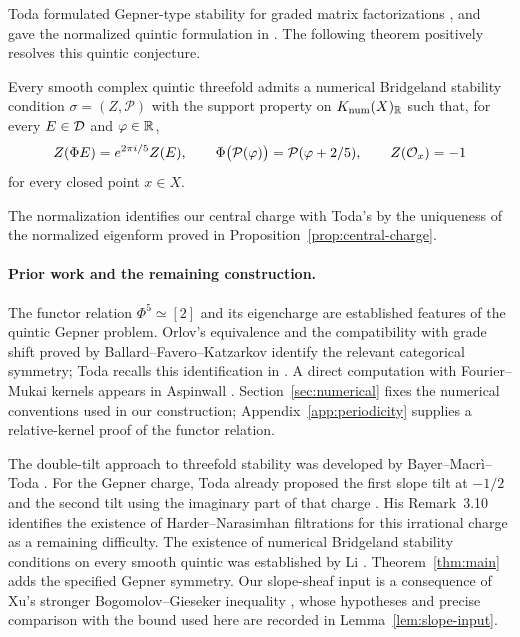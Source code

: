 Toda formulated Gepner-type stability for graded matrix factorizations
\cite[Definition~2.3 and Conjecture~1.2]{Toda2013}, and gave the normalized
quintic formulation in \cite[Conjecture~3.1]{TodaQuintic2013}.
The following theorem positively resolves this quintic conjecture.

\begin{theorem}\label{thm:main}
Every smooth complex quintic threefold admits a numerical Bridgeland stability
condition $\sigma=(Z,\mathcal P)$ with the support property on $K_{\mathrm{num}}(X)_{\mathbb R}$
such that, for every $E\in\mathcal D$ and $\varphi\in\mathbb R$,
\[
 Z(\Phi E)=e^{2\pi i/5}Z(E),\qquad
 \Phi\bigl(\mathcal P(\varphi)\bigr)=\mathcal P(\varphi+2/5),\qquad
 Z(\mathcal O_x)=-1
\]
for every closed point $x\in X$.
\end{theorem}

The normalization identifies our central charge with Toda's by the uniqueness
of the normalized eigenform proved in Proposition~\ref{prop:central-charge}.

\paragraph{Prior work and the remaining construction.}
The functor relation $\Phi^5\simeq[2]$ and its eigencharge are established
features of the quintic Gepner problem. Orlov's equivalence
\cite[Theorem~2.5]{Orlov2009} and the compatibility with grade shift proved by
Ballard--Favero--Katzarkov \cite[Proposition~5.8 and Remark~5.12]{BallardFaveroKatzarkov2012}
identify the relevant categorical symmetry; Toda recalls this identification
in \cite[Theorem~2.5]{TodaQuintic2013}. A direct computation with
Fourier--Mukai kernels appears in Aspinwall \cite[Section~7.1.4]{Aspinwall2004}.
Section~\ref{sec:numerical} fixes the numerical conventions used in our
construction; Appendix~\ref{app:periodicity} supplies a relative-kernel proof
of the functor relation.

The double-tilt approach to threefold stability was developed by
Bayer--Macr\`i--Toda \cite{BayerMacriToda2014}. For the Gepner charge, Toda
already proposed the first slope tilt at $-1/2$ and the second tilt using
the imaginary part of that charge
\cite[Sections~3.4--3.6 and Conjecture~3.9]{TodaQuintic2013}.
His Remark~3.10 identifies the existence of Harder--Narasimhan filtrations
for this irrational charge as a remaining difficulty.
The existence of numerical Bridgeland stability conditions on every smooth
quintic was established by Li \cite[Theorem~1.3]{Li2019}.
Theorem~\ref{thm:main} adds the specified Gepner symmetry.
Our slope-sheaf input is a consequence
of Xu's stronger Bogomolov--Gieseker inequality
\cite[Theorem~1.3]{Xu2026}, whose hypotheses and precise comparison with the
bound used here are recorded in Lemma~\ref{lem:slope-input}.

